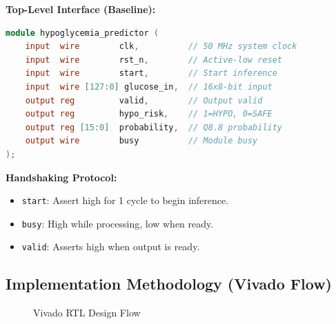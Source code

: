 \documentclass[11pt, a4paper]{article}
\begin{document}
\textbf{Top-Level Interface (Baseline):}
\begin{lstlisting}[language=Verilog, caption={Top Module Interface}]
module hypoglycemia_predictor (
    input  wire        clk,          // 50 MHz system clock
    input  wire        rst_n,        // Active-low reset
    input  wire        start,        // Start inference
    input  wire [127:0] glucose_in,  // 16x8-bit input
    output reg         valid,        // Output valid
    output reg         hypo_risk,    // 1=HYPO, 0=SAFE
    output reg [15:0]  probability,  // Q8.8 probability
    output wire        busy          // Module busy
);
\end{lstlisting}

\textbf{Handshaking Protocol:}
\begin{itemize}
    \item \texttt{start}: Assert high for 1 cycle to begin inference.
    \item \texttt{busy}: High while processing, low when ready.
    \item \texttt{valid}: Asserts high when output is ready.
\end{itemize}

\subsection{Implementation Methodology (Vivado Flow)}

\begin{figure}[H]
\centering
{}
\caption{Vivado RTL Design Flow}
\label{fig:vivado_flow}
\end{figure}
\end{document}
